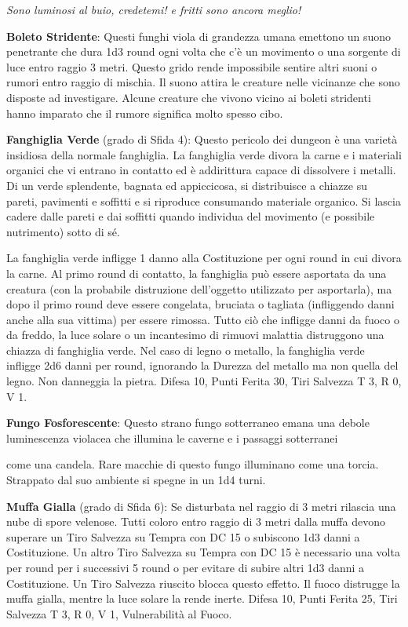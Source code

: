 \begin{multicols}{2}
\begin{center}
	\emph{Sono luminosi al buio, credetemi! e fritti sono ancora meglio!}
\end{center}

\textbf{Boleto Stridente}: Questi funghi viola di grandezza umana emettono un suono penetrante che dura 1d3 round ogni volta che c'è un movimento o una sorgente di luce entro raggio 3 metri. Questo grido rende impossibile sentire altri suoni o rumori entro raggio di mischia. Il suono attira le creature nelle vicinanze che sono disposte ad investigare. Alcune creature che vivono vicino ai boleti stridenti hanno imparato che il rumore significa molto spesso cibo.

\textbf{Fanghiglia Verde} (grado di Sfida 4): Questo pericolo dei dungeon è una varietà insidiosa della normale fanghiglia.
La fanghiglia verde divora la carne e i materiali organici che vi entrano in contatto ed è addirittura capace di dissolvere i metalli. Di un verde splendente, bagnata ed appiccicosa, si distribuisce a chiazze su pareti, pavimenti e soffitti e si riproduce consumando materiale organico. Si lascia cadere dalle pareti e dai soffitti quando individua del movimento (e possibile nutrimento) sotto di sé.

La fanghiglia verde infligge 1 danno alla Costituzione per ogni round in cui divora la carne. Al primo round di contatto, la fanghiglia può essere asportata da una creatura (con la probabile distruzione dell'oggetto utilizzato per asportarla), ma dopo il primo round deve essere congelata, bruciata o tagliata (infliggendo danni anche alla sua vittima) per essere rimossa. Tutto ciò che infligge danni da fuoco o da freddo, la luce solare o un incantesimo di rimuovi malattia distruggono una chiazza di fanghiglia verde. Nel caso di legno o metallo, la fanghiglia verde infligge 2d6 danni per round, ignorando la Durezza del metallo ma non quella del legno. Non danneggia la pietra. Difesa 10, Punti Ferita 30, Tiri Salvezza T 3, R 0, V 1.

\textbf{Fungo Fosforescente}: Questo strano fungo sotterraneo emana una debole luminescenza violacea che illumina le caverne e i passaggi sotterranei

come una candela. Rare macchie di questo fungo illuminano come una torcia. Strappato dal suo ambiente si spegne in un 1d4 turni.

\textbf{Muffa Gialla} (grado di Sfida 6): Se disturbata nel raggio di 3 metri rilascia una nube di spore velenose. Tutti coloro entro raggio di 3 metri dalla muffa devono superare un Tiro Salvezza su Tempra con DC 15 o subiscono 1d3 danni a Costituzione. Un altro Tiro Salvezza su Tempra con DC 15 è necessario una volta per round per i successivi 5 round o per evitare di subire altri 1d3 danni a Costituzione. Un Tiro Salvezza riuscito blocca questo effetto. Il fuoco distrugge la muffa gialla, mentre la luce solare la rende inerte. Difesa 10, Punti Ferita 25, Tiri Salvezza T 3, R 0, V 1, Vulnerabilità al Fuoco.


\end{multicols}
